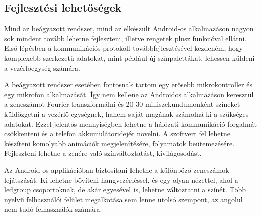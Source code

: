 \documentclass[../main.tex]{subfiles}
\begin{document}
    \subsection{Fejlesztési lehetőségek}
        Mind az beágyazott rendszer, mind az elkészült Android-os alkalmazáson nagyon sok mindent tovább lehetne fejleszteni, illetve rengetek plusz funkcióval ellátni. Első lépésben a kommunikációs protokoll továbbfejlesztésével kezdeném, hogy komplexebb szerkezetű adatokat, mint például új színpalettákat, lehessen küldeni a vezérlőegység számára.
        
        A beágyazott rendszer esetében fontosnak tartom egy erősebb mikrokontroller és egy mikrofon alkalmazását. Így nem kellene az Androidos alkalmazáson keresztül a zeneszámot Fourier transzformálni és 20-30 milliszekundumonként színeket küldözgetni a vezérlő egységnek, hanem saját magának számolná ki a szükséges adatokat. Ezzel jelentős mennyiségben lehetne a hálózati kommunikáció forgalmát csökkenteni és a telefon akkumulátoridejét növelni. A szoftvert fel lehetne készíteni komolyabb animációk megjelenítésére, folyamatok beütemezésére. Fejleszteni lehetne a zenére való színváltoztatást, kivilágosodást.
        
        Az Android-os applikációban biztosítani lehetne a különböző zeneszámok lejátszását. Ki lehetne bővíteni hangvezérléssel, és egy olyan nézettel, ahol a ledgroup csoportoknak, de akár egyesével is, lehetne változtatni a színét. Több nyelvű felhasználói felület megalkotása sem lenne utolsó szempont, az angolul nem tudó felhasználók számára. 
        
        
\end{document}
